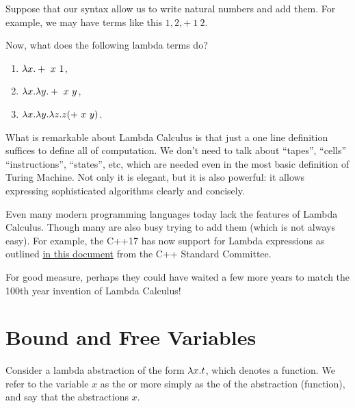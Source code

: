 \begin{exercise}
\label{xrcs:lcs::syn::bnf} 
Suppose that our syntax allow us to write natural numbers and add
them.  For example, we may have terms like this $1, 2, +~1~2$.

Now, what does the following lambda terms do?
\begin{enumerate}
\item $\lambda x. +~x~1$,
\item $\lambda x. \lambda y. +~x~y$,
\item $\lambda x. \lambda y. \lambda z.  z (+~x~y)$.
\end{enumerate}
\end{exercise}


\begin{gram}[Summary]
\label{grm:lcs::syn::summary} 
What is remarkable about Lambda Calculus is that just a one line definition suffices to define all of computation.
%
We don't need to talk about ``tapes'', ``cells'' ``instructions'', ``states'', etc, which are needed even in the most basic definition of Turing Machine.
%
Not only it is  elegant, but it is also powerful: it allows expressing sophisticated algorithms clearly and concisely.
%

\end{gram}

\begin{note}
\label{nt:lcs::syn::pl} 
Even many modern programming languages today lack the features of Lambda Calculus.
%
Though many are also busy trying to add them (which is not always easy).
%
For example,
the C++17 has now support for Lambda expressions as outlined 
%
\href{http://www.open-std.org/jtc1/sc22/wg21/docs/papers/2016/p0170r1.pdf}
{in this document}
%
from the C++ Standard Committee.

For good measure, perhaps they could have waited a few more
years to match the 100th year invention of Lambda Calculus!
\end{note}


\section{Bound and Free Variables}
\label{sec:lcs::variables}

\begin{definition}
\label{def:lcs::binding}
Consider a lambda abstraction of the form $\lambda x. t$, which denotes a
function.
%
We refer to the variable $x$ as the  or more
simply as the  of the abstraction (function),
%
and
%
say that the abstractions  $x$.
%
\end{definition}


